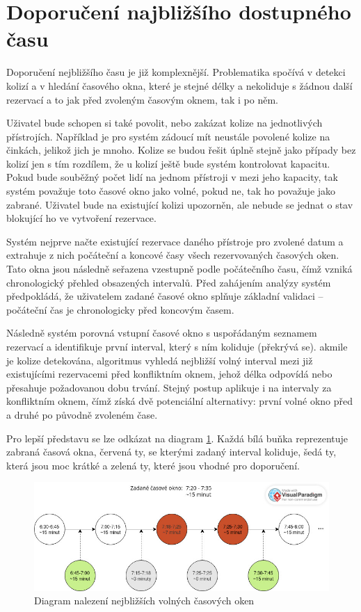 \section{Doporučení najbližšího dostupného času}
Doporučení nejbližšího času je již komplexnější. Problematika spočívá v detekci kolizí a v hledání časového okna, které je stejné délky a nekoliduje s žádnou další rezervací a to jak před zvoleným časovým oknem, tak i po něm.

Uživatel bude schopen si také povolit, nebo zakázat kolize na jednotlivých přístrojích. Například je pro systém zádoucí mít neustále povolené kolize na činkách, jelikož jich je mnoho. Kolize se budou řešit úplně stejně jako případy bez kolizí jen s tím rozdílem, že u kolizí ještě bude systém kontrolovat kapacitu. Pokud bude souběžný počet lidí na jednom přístroji v mezi jeho kapacity, tak systém považuje toto časové okno jako volné, pokud ne, tak ho považuje jako zabrané. Uživatel bude na existující kolizi upozorněn, ale nebude se jednat o stav blokující ho ve vytvoření rezervace.

Systém nejprve načte existující rezervace daného přístroje pro zvolené datum a extrahuje z nich počáteční a koncové časy všech rezervovaných časových oken. Tato okna jsou následně seřazena vzestupně podle počátečního času, čímž vzniká chronologický přehled obsazených intervalů. Před zahájením analýzy systém předpokládá, že uživatelem zadané časové okno splňuje základní validaci – počáteční čas je chronologicky před koncovým časem.

Následně systém porovná vstupní časové okno s uspořádaným seznamem rezervací a identifikuje první interval, který s ním koliduje (překrývá se). akmile je kolize detekována, algoritmus vyhledá nejbližší volný interval mezi již existujícími rezervacemi před konfliktním oknem, jehož délka odpovídá nebo přesahuje požadovanou dobu trvání. Stejný postup aplikuje i na intervaly za konfliktním oknem, čímž získá dvě potenciální alternativy: první volné okno před a druhé po původně zvoleném čase.

Pro lepší představu se lze odkázat na diagram \ref{fig:ReservationTimeSuggestionDiagram}. Každá bílá buňka reprezentuje zabraná časová okna, červená ty, se kterými zadaný interval koliduje, šedá ty, která jsou moc krátké a zelená ty, které jsou vhodné pro doporučení. 

\begin{figure}
    \centering
    \includegraphics[width=1\textwidth]{Figures/time_suggestion_diagram.jpg}
    \caption{Diagram nalezení nejbližších volných časových oken}
    \label{fig:ReservationTimeSuggestionDiagram}
\end{figure}

